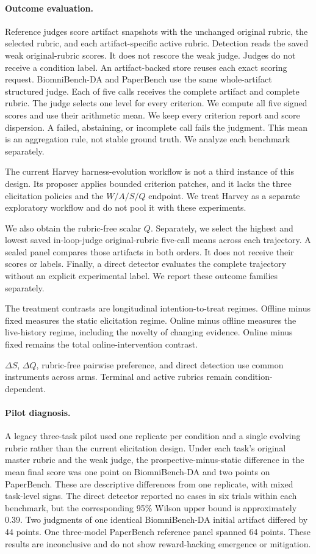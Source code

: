 \documentclass{article} %
\begin{document}
\paragraph{Outcome evaluation.}
Reference judges score artifact snapshots with the unchanged original rubric,
the selected rubric, and each artifact-specific active rubric. Detection reads
the saved weak original-rubric scores. It does not rescore the weak judge.
Judges do not receive a condition label. An artifact-backed store reuses each
exact scoring request.
BiomniBench-DA and PaperBench use the same whole-artifact structured judge. Each
of five calls receives the complete artifact and complete rubric. The judge
selects one level for every criterion. We compute all five signed scores and use
their arithmetic mean. We keep every criterion report and score dispersion. A
failed, abstaining, or incomplete call fails the judgment. This mean is an
aggregation rule, not stable ground truth. We analyze each benchmark separately.

The current Harvey harness-evolution workflow is not a third instance of this
design. Its proposer applies bounded criterion patches, and it lacks the three
elicitation policies and the $W/A/S/Q$ endpoint. We treat Harvey as a separate
exploratory workflow and do not pool it with these experiments.

We also obtain the rubric-free scalar $Q$. Separately, we select the highest and
lowest saved in-loop-judge original-rubric five-call means across each trajectory. A sealed panel
compares those artifacts in both orders. It does not receive their scores or
labels. Finally, a direct detector evaluates the complete trajectory without an
explicit experimental label. We report these outcome families separately.

The treatment contrasts are longitudinal intention-to-treat regimes.
Offline minus fixed measures the static elicitation regime. Online minus offline
measures the live-history regime, including the novelty of changing evidence.
Online minus fixed remains the total online-intervention contrast.

$\Delta S$, $\Delta Q$, rubric-free pairwise preference, and direct detection use
common instruments across arms. Terminal and active rubrics remain
condition-dependent.

\paragraph{Pilot diagnosis.}
A legacy three-task pilot used one replicate per condition and a single evolving
rubric rather than the current elicitation design. Under each task's original master
rubric and the weak judge, the prospective-minus-static difference in the mean
final score was one point on BiomniBench-DA and two points on PaperBench. These
are descriptive differences from one replicate, with mixed task-level signs.
The direct detector reported no cases in six trials within each benchmark, but
the corresponding 95\% Wilson upper bound is approximately 0.39. Two judgments
of one identical BiomniBench-DA initial artifact differed by 44 points. One
three-model PaperBench reference panel spanned 64 points. These results are
inconclusive and do not show reward-hacking emergence or mitigation.
\end{document}
